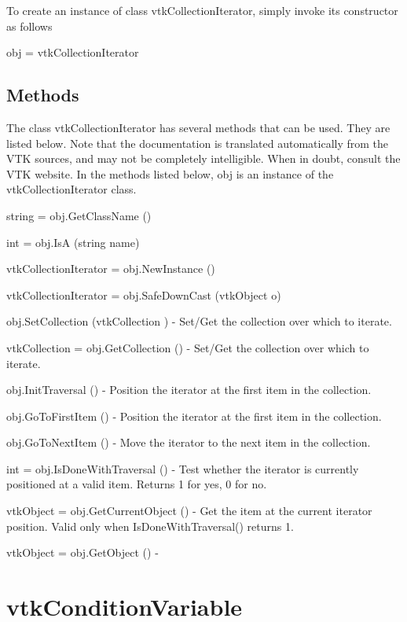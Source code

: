 To create an instance of class vtk\-Collection\-Iterator, simply invoke its constructor as follows \begin{DoxyVerb}  obj = vtkCollectionIterator
\end{DoxyVerb}
 \hypertarget{vtkwidgets_vtkxyplotwidget_Methods}{}\subsection{Methods}\label{vtkwidgets_vtkxyplotwidget_Methods}
The class vtk\-Collection\-Iterator has several methods that can be used. They are listed below. Note that the documentation is translated automatically from the V\-T\-K sources, and may not be completely intelligible. When in doubt, consult the V\-T\-K website. In the methods listed below, {\ttfamily obj} is an instance of the vtk\-Collection\-Iterator class. 
\begin{DoxyItemize}
\item {\ttfamily string = obj.\-Get\-Class\-Name ()}  
\item {\ttfamily int = obj.\-Is\-A (string name)}  
\item {\ttfamily vtk\-Collection\-Iterator = obj.\-New\-Instance ()}  
\item {\ttfamily vtk\-Collection\-Iterator = obj.\-Safe\-Down\-Cast (vtk\-Object o)}  
\item {\ttfamily obj.\-Set\-Collection (vtk\-Collection )} -\/ Set/\-Get the collection over which to iterate.  
\item {\ttfamily vtk\-Collection = obj.\-Get\-Collection ()} -\/ Set/\-Get the collection over which to iterate.  
\item {\ttfamily obj.\-Init\-Traversal ()} -\/ Position the iterator at the first item in the collection.  
\item {\ttfamily obj.\-Go\-To\-First\-Item ()} -\/ Position the iterator at the first item in the collection.  
\item {\ttfamily obj.\-Go\-To\-Next\-Item ()} -\/ Move the iterator to the next item in the collection.  
\item {\ttfamily int = obj.\-Is\-Done\-With\-Traversal ()} -\/ Test whether the iterator is currently positioned at a valid item. Returns 1 for yes, 0 for no.  
\item {\ttfamily vtk\-Object = obj.\-Get\-Current\-Object ()} -\/ Get the item at the current iterator position. Valid only when Is\-Done\-With\-Traversal() returns 1.  
\item {\ttfamily vtk\-Object = obj.\-Get\-Object ()} -\/  
\end{DoxyItemize}\hypertarget{vtkcommon_vtkconditionvariable}{}\section{vtk\-Condition\-Variable}\label{vtkcommon_vtkconditionvariable}
